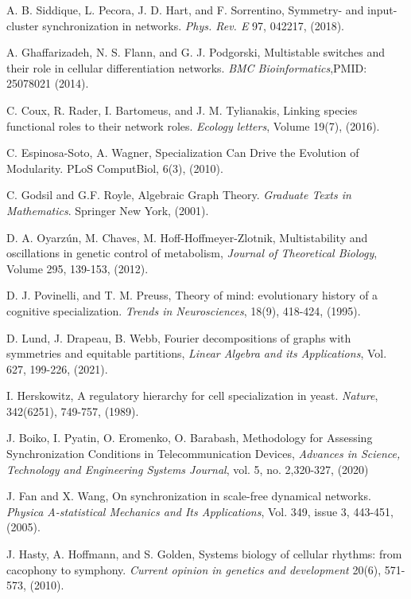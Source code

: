 \documentclass[12pt]{thesis}
\begin{document}
\begin{thebibliography}{99}
     A. B. Siddique, L. Pecora, J. D. Hart, and F. Sorrentino, Symmetry- and input-cluster synchronization in networks. \textit{Phys. Rev. E} 97, 042217, (2018).
    
     A. Ghaffarizadeh, N. S. Flann, and G. J. Podgorski, Multistable switches and their role in cellular differentiation networks. \textit{BMC Bioinformatics},PMID: 25078021 (2014).
    
     C. Coux, R. Rader, I. Bartomeus, and J. M. Tylianakis, Linking species functional roles to their network roles. \textit{Ecology letters}, Volume 19(7), (2016).
    
     C. Espinosa-Soto, A. Wagner, Specialization Can Drive the Evolution of Modularity. PLoS ComputBiol, 6(3), (2010).
    
     C. Godsil and G.F. Royle, Algebraic Graph Theory. \textit{Graduate Texts in Mathematics}. Springer New York, (2001).
    
     D. A. Oyarzún, M. Chaves, M. Hoff-Hoffmeyer-Zlotnik, Multistability and oscillations in genetic control of metabolism, \textit{Journal of Theoretical Biology}, Volume 295, {139-153}, (2012).
    
     D. J. Povinelli, and T. M. Preuss, Theory of mind: evolutionary history of a cognitive specialization. \textit{Trends in Neurosciences}, 18(9), 418-424, (1995).
    
     D. Lund, J. Drapeau, B. Webb, Fourier decompositions of graphs with symmetries and equitable partitions, \textit{Linear Algebra and its Applications}, Vol. 627, {199-226}, (2021).
    
     I. Herskowitz, A regulatory hierarchy for cell specialization in yeast. \textit{Nature}, 342(6251), 749-757, (1989).
    
     J. Boiko, I. Pyatin, O. Eromenko, O. Barabash, Methodology for Assessing Synchronization Conditions in Telecommunication Devices, \textit{Advances in Science, Technology and Engineering Systems Journal}, vol. 5, no. 2,{320-327, (2020)}
    
     J. Fan and X. Wang, On synchronization in scale-free dynamical networks. \textit{Physica A-statistical Mechanics and Its Applications}, Vol. 349, issue 3, {443-451}, (2005).
    
     J. Hasty, A. Hoffmann, and S. Golden, Systems biology of cellular rhythms: from cacophony to symphony. \textit{Current opinion in genetics and development} {20(6), 571-573, (2010).}
    

\end{thebibliography}
\end{document}

